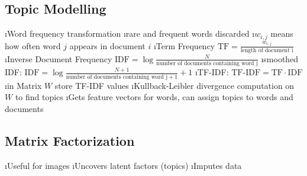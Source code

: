 \subsection{Topic Modelling}

\bi
\i Word frequency transformation
\i rare and frequent words discarded
\i $w_{i,j}$ means how often word $j$ appears in document $i$
\i Term Frequency $\text{TF} = \frac{w_{i,j}}{\text{length of document i}}$
\i Inverse Document Frequency $\text{IDF} = \log \frac{N}{\text{number of documents containing word j}}$
\i smoothed IDF: $\text{IDF} = \log \frac{N+1}{\text{number of documents containing word j} + 1} + 1$
\i TF-IDF: $\text{TF-IDF} = \text{TF} \cdot \text{IDF}$
\i in Matrix $W$ store TF-IDF values
\i Kullback-Leibler divergence computation on $W$ to find topics
\i Gets feature vectors for words, can assign topics to words and documents
\ei

\subsection{Matrix Factorization}

\bi
\i Useful for images
\i Uncovers latent factors (topics)
\i Imputes data
\ei